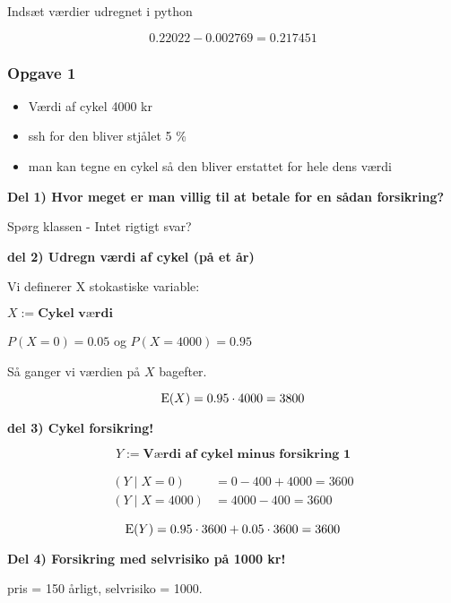 Indsæt værdier udregnet i python

\begin{equation}
    0.22022 - 0.002769 = 0.217451
\end{equation}

\subsubsection{Opgave 1}

\begin{itemize}
    \item Værdi af cykel 4000 kr
    \item ssh for den bliver stjålet 5 \%
    \item man kan tegne en cykel så den bliver erstattet for hele dens værdi
\end{itemize}

\textbf{Del 1) Hvor meget er man villig til at betale for en sådan forsikring?}

Spørg klassen - Intet rigtigt svar?

\textbf{del 2) Udregn værdi af cykel (på et år)}

Vi definerer X stokastiske variable:

$X:= \textbf{Cykel værdi}$

$P(X=0) = 0.05$ og $P(X=4000) = 0.95$


Så ganger vi værdien på $X$ bagefter.

\begin{equation}
    \text{E}(X) = 0.95 \cdot 4000 = 3800
\end{equation}

\textbf{del 3) Cykel forsikring!}

\begin{equation}
    Y:= \textbf{Værdi af cykel minus forsikring 1}
\end{equation}

\begin{align}
    (Y\mid X=0) &= 0 - 400 + 4000 = 3600\\ (Y \mid X=4000) &= 4000 - 400 = 3600
\end{align}

\begin{equation}
    \text{E}(Y) = 0.95 \cdot 3600 + 0.05 \cdot 3600 = 3600
\end{equation}

\textbf{Del 4) Forsikring med selvrisiko på 1000 kr!}

pris = 150 årligt, selvrisiko = 1000.

